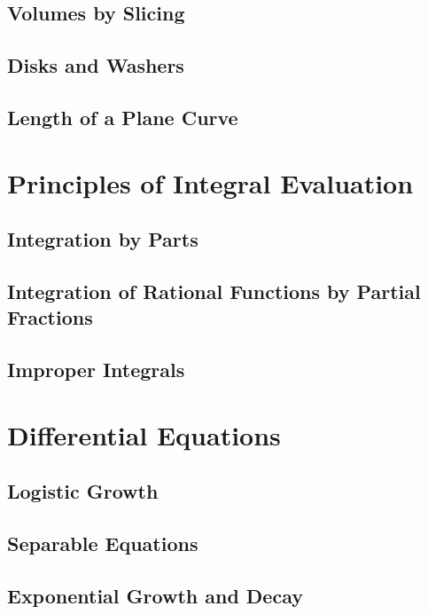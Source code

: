 \documentclass[letterpaper]{report}
\theoremstyle{definition}
\begin{document}
\section{Volumes by Slicing}

\section{Disks and Washers}

\section{Length of a Plane Curve}


\chapter{Principles of Integral Evaluation}

\section{Integration by Parts}

\section{Integration of Rational Functions by Partial Fractions}

\section{Improper Integrals}


\chapter{Differential Equations}

\section{Logistic Growth}

\section{Separable Equations}

\section{Exponential Growth and Decay}
\end{document}
